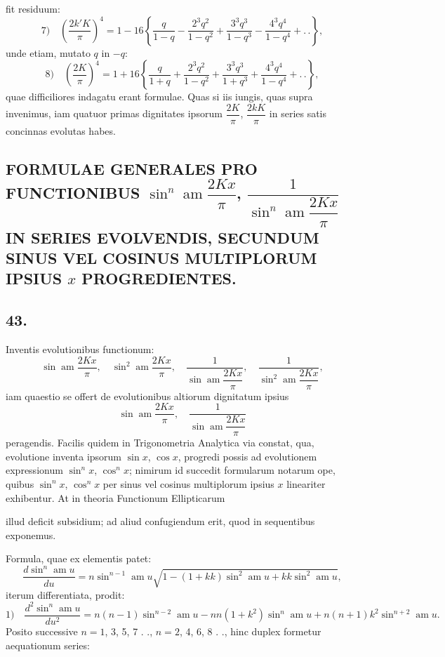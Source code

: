 \documentclass{article}
\begin{document}
fit residuum:
\[
\text{7)}\quad\left(\frac{2k'K}{\pi}\right)^{4}=1-16\left\{\frac{q}{1-q}-\frac{2^{3}q^{2}}{1-q^{2}}+\frac{3^{3}q^{3}}{1-q^{3}}-\frac{4^{3}q^{4}}{1-q^{4}}+.\,.\right\},
\]
unde etiam, mutato $q$ in $-q$:
\[
\text{8)}\quad\left(\frac{2K}{\pi}\right)^{4}=1+16\left\{\frac{q}{1+q}+\frac{2^{3}q^{2}}{1-q^{2}}+\frac{3^{3}q^{3}}{1+q^{3}}+\frac{4^{3}q^{4}}{1-q^{4}}+.\,.\right\},
\]
quae difficiliores indagatu erant formulae. Quas si iis iungis, quas supra invenimus, iam quatuor primas dignitates ipsorum $\dfrac{2K}{\pi}$, $\dfrac{2kK}{\pi}$ in series satis concinnas evolutas habes.

\subsection*{FORMULAE GENERALES PRO FUNCTIONIBUS $\sin^{n}\operatorname{am}\dfrac{2Kx}{\pi}$, $\dfrac{1}{\sin^{n}\operatorname{am}\dfrac{2Kx}{\pi}}$ IN SERIES EVOLVENDIS, SECUNDUM SINUS VEL COSINUS MULTIPLORUM IPSIUS $x$ PROGREDIENTES.}

\subsection*{43.}

Inventis evolutionibus functionum:
\[
\sin\operatorname{am}\frac{2Kx}{\pi},\quad\sin^{2}\operatorname{am}\frac{2Kx}{\pi},\quad\frac{1}{\sin\operatorname{am}\dfrac{2Kx}{\pi}},\quad\frac{1}{\sin^{2}\operatorname{am}\dfrac{2Kx}{\pi}},
\]
iam quaestio se offert de evolutionibus altiorum dignitatum ipsius
\[
\sin\operatorname{am}\frac{2Kx}{\pi},\quad\frac{1}{\sin\operatorname{am}\dfrac{2Kx}{\pi}}
\]
peragendis. Facilis quidem in Trigonometria Analytica via constat, qua, evolutione inventa ipsorum $\sin x$, $\cos x$, progredi possis ad evolutionem expressionum $\sin^{n}x$, $\cos^{n}x$; nimirum id succedit formularum notarum ope, quibus $\sin^{n}x$, $\cos^{n}x$ per sinus vel cosinus multiplorum ipsius $x$ lineariter exhibentur. At in theoria Functionum Ellipticarum

illud deficit subsidium; ad aliud confugiendum erit, quod in sequentibus exponemus.

Formula, quae ex elementis patet:
\[
\frac{d\sin^{n}\operatorname{am}u}{du}=n\sin^{n-1}\operatorname{am}u\sqrt{1-(1+kk)\sin^{2}\operatorname{am}u+kk\sin^{2}\operatorname{am}u},
\]
iterum differentiata, prodit:
\[
\text{1)}\quad\frac{d^{2}\sin^{n}\operatorname{am}u}{du^{2}}=n(n-1)\sin^{n-2}\operatorname{am}u-nn(1+k^{2})\sin^{n}\operatorname{am}u+n(n+1)k^{2}\sin^{n+2}\operatorname{am}u.
\]
Posito successive $n=1$, 3, 5, 7 . ., $n=2$, 4, 6, 8 . ., hinc duplex formetur aequationum series:
\end{document}
